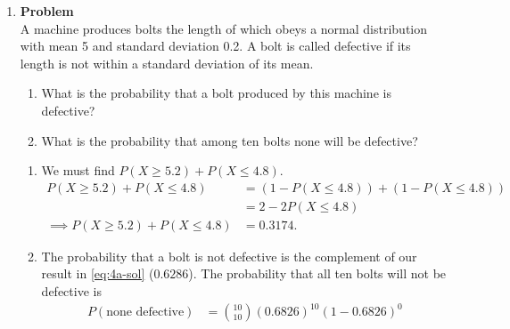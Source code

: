 \documentclass[12pt]{article}
\newenvironment{Ex}{\textbf{Problem}\vspace{.75em}\\}{}
\begin{document}
\begin{enumerate}
\begin{Ex}
\begin{solution}
\begin{enumerate}
\begin{equation}
          \label{eq:3b-sol}
          \begin{aligned}
            P\left(\frac{1}{2} < X < \frac{2}{3}\right) &=
            \frac{\frac{2}{3}}{4} - \frac{\frac{1}{2}}{4} \\
            \implies P\left(\frac{1}{2} < X < \frac{2}{3}\right) &=
            0.0417.
          \end{aligned}
        \end{equation}
      \end{enumerate}
    \end{solution}
  \end{Ex}
  \pagebreak[4]
\item
  \begin{Ex}
    A machine produces bolts the length of which obeys a normal
    distribution with mean 5 and standard deviation 0.2. A bolt is
    called defective if its length is not within a standard deviation
    of its mean.
    \begin{enumerate}
    \item What is the probability that a bolt produced by this machine
      is defective?
    \item What is the probability that among ten bolts none will be
      defective?
    \end{enumerate}
    \begin{solution} \hfill
      \begin{enumerate}
      \item We must find $P(X \ge 5.2) + P(X \le 4.8)$.
        \begin{equation}
          \label{eq:4a-sol}
          \begin{aligned}
            P(X \ge 5.2) + P(X \le 4.8) &= (1-P(X \le 4.8)) + (1-P(X
            \le 4.8)) \\
            &= 2-2P(X \le 4.8) \\
            \implies P(X \ge 5.2) + P(X \le 4.8) &= 0.3174.
          \end{aligned}
        \end{equation}
      \item The probability that a bolt is not defective is the
        complement of our result in \cref{eq:4a-sol} ($0.6286$). The
        probability that all ten bolts will not be defective is
        \begin{equation}
          \label{eq:4b-sol}
          \begin{aligned}
            P(\text{none defective}) &= {10 \choose 10}
            (0.6826)^{10}(1-0.6826)^0 \\

\end{aligned}
\end{equation}
\end{enumerate}
\end{solution}
\end{Ex}
\end{enumerate}
\end{document}
